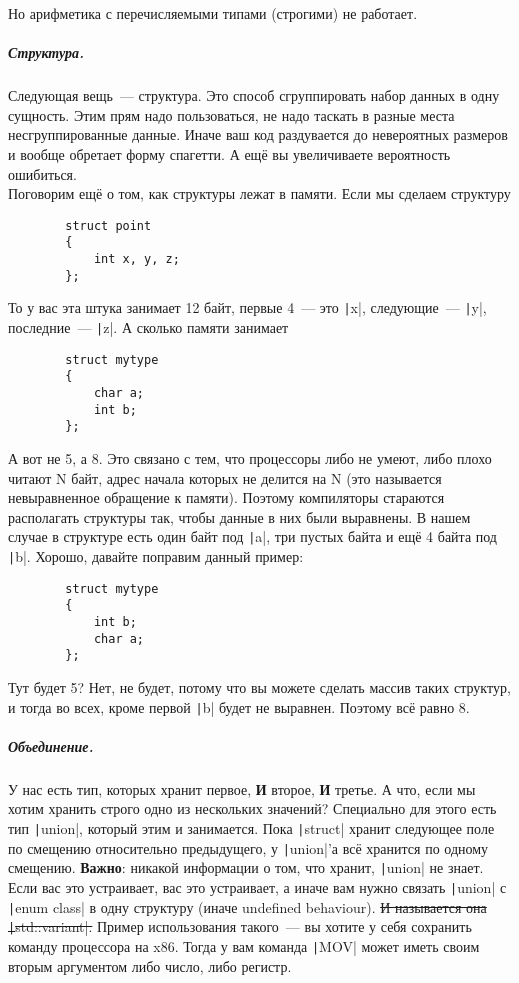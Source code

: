 \documentclass{article}
\begin{document}
    Но арифметика с перечисляемыми типами (строгими) не работает.
    \subparagraph{Структура.}
    Следующая вещь~--- структура. Это способ сгруппировать набор данных в одну сущность. Этим прям надо пользоваться, не надо таскать в разные места несгруппированные данные. Иначе ваш код раздувается до невероятных размеров и вообще обретает форму спагетти. А ещё вы увеличиваете вероятность ошибиться.\\
    Поговорим ещё о том, как структуры лежат в памяти. Если мы сделаем структуру
    \begin{verbatim}
        struct point
        {
            int x, y, z;
        };
    \end{verbatim}
    То у вас эта штука занимает 12 байт, первые 4~--- это \texttt|x|, следующие~--- \texttt|y|, последние~--- \texttt|z|. А сколько памяти занимает
    \begin{verbatim}
        struct mytype
        {
            char a;
            int b;
        };
    \end{verbatim}
    А вот не 5, а 8. Это связано с тем, что процессоры либо не умеют, либо плохо читают N байт, адрес начала которых не делится на N (это называется невыравненное обращение к памяти). Поэтому компиляторы стараются располагать структуры так, чтобы данные в них были выравнены. В нашем случае в структуре есть один байт под \texttt|a|, три пустых байта и ещё 4 байта под \texttt|b|. Хорошо, давайте поправим данный пример:
    \begin{verbatim}
        struct mytype
        {
            int b;
            char a;
        };
    \end{verbatim}
    Тут будет 5? Нет, не будет, потому что вы можете сделать массив таких структур, и тогда во всех, кроме первой \texttt|b| будет не выравнен. Поэтому всё равно 8.
    \subparagraph{Объединение.}
    У нас есть тип, которых хранит первое, \textbf{И} второе, \textbf{И} третье. А что, если мы хотим хранить строго одно из нескольких значений? Специально для этого есть тип \texttt|union|, который этим и занимается. Пока \texttt|struct| хранит следующее поле по смещению относительно предыдущего, у \texttt|union|'а всё хранится по одному смещению. \textbf{Важно}: никакой информации о том, что хранит, \texttt|union| не знает. Если вас это устраивает, вас это устраивает, а иначе вам нужно связать \texttt|union| с \texttt|enum class| в одну структуру (иначе undefined behaviour). \sout{И называется она \texttt|std::variant|.} Пример использования такого~--- вы хотите у себя сохранить команду процессора на x86. Тогда у вам команда \texttt|MOV| может иметь своим вторым аргументом либо число, либо регистр.
\end{document}
